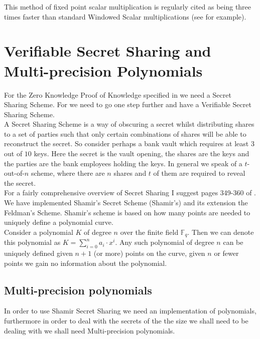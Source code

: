\documentclass[ %
                    author={Nicholas Tutte},
                supervisor={Prof. Nigel Smart},
                    degree={MEng},
                     title={Secure Two Party Computation},
                  subtitle={A practical comparison of recent protocols},
                      type={Research - GG1K},
                      year={2015} ]{dissertation}
\begin{document}
\begin{appendices}
						This method of fixed point scalar multiplication is regularly cited as being three times faster than standard Windowed Scalar multiplications (see \cite{LindellPinkasSmart2008} for example).


			\section{Verifiable Secret Sharing and Multi-precision Polynomials}

				For the Zero Knowledge Proof of Knowledge specified in \cite{LindellAndPinkas2011} we need a Secret Sharing Scheme. For \cite{Katz_Symm_CnC_2013} we need to go one step further and have a Verifiable Secret Sharing Scheme.\\

				A Secret Sharing Scheme is a way of obscuring a secret whilst distributing shares to a set of parties such that only certain combinations of shares will be able to reconstruct the secret. So consider perhaps a bank vault which requires at least $3$ out of $10$ keys. Here the secret is the vault opening, the shares are the keys and the parties are the bank employees holding the keys. In general we speak of a $t$-out-of-$n$ scheme, where there are $n$ shares and $t$ of them are required to reveal the secret.\\

				For a fairly comprehensive overview of Secret Sharing I suggest pages 349-360 of \cite{NigelCryptoBook}.\\

				We have implemented Shamir's Secret Scheme (Shamir's) and its extension the Feldman's Scheme. Shamir's scheme is based on how many points are needed to uniquely define a polynomial curve.\\

				Consider a polynomial $K$ of degree $n$ over the finite field $\mathbb{F}_q$. Then we can denote this polynomial as $K = \sum_{i=0}^{n} a_i \cdot x ^ i$. Any such polynomial of degree $n$ can be uniquely defined given $n+1$ (or more) points on the curve, given $n$ or fewer points we gain no information about the polynomial.

				\subsection{Multi-precision polynomials}
					In order to use Shamir Secret Sharing we need an implementation of polynomials, furthermore in order to deal with the secrets of the the size we shall need to be dealing with we shall need Multi-precision polynomials.\\
					

\end{appendices}
\end{document}
